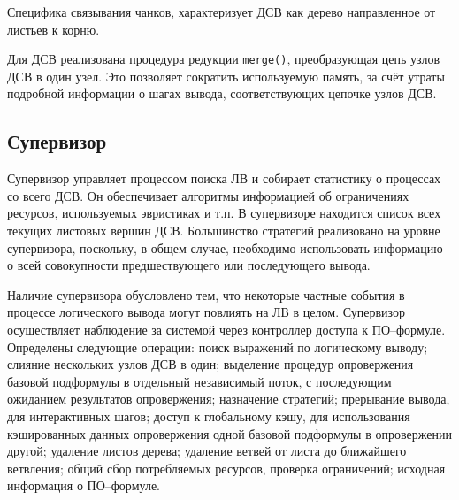 Специфика связывания чанков, характеризует ДСВ как дерево направленное от листьев к корню.

Для ДСВ реализована процедура редукции {\tt merge()}, преобразующая цепь узлов ДСВ в один узел. Это позволяет сократить используемую память, за счёт утраты подробной информации о шагах вывода, соответствующих цепочке узлов ДСВ.


\subsection{Супервизор}
Супервизор управляет процессом поиска ЛВ и собирает статистику о процессах со всего ДСВ. Он обеспечивает алгоритмы информацией об ограничениях ресурсов, используемых эвристиках и т.п. В супервизоре находится список всех текущих листовых вершин ДСВ. Большинство стратегий реализовано на уровне супервизора, поскольку, в общем случае, необходимо использовать информацию о всей совокупности предшествующего или последующего вывода.

Наличие супервизора обусловлено тем, что некоторые частные события в процессе логического вывода могут повлиять на ЛВ в целом. Супервизор осуществляет наблюдение за системой через контроллер доступа к ПО--формуле. Определены следующие операции: поиск выражений по логическому выводу; слияние нескольких узлов ДСВ в один; выделение процедур опровержения базовой подформулы в отдельный независимый поток, с последующим ожиданием результатов опровержения; назначение стратегий; прерывание вывода, для интерактивных шагов; доступ к глобальному кэшу, для использования кэшированных данных опровержения одной базовой подформулы в опровержении другой; удаление листов дерева; удаление ветвей от листа до ближайшего ветвления; общий сбор потребляемых ресурсов, проверка ограничений; исходная информация о ПО--формуле.

